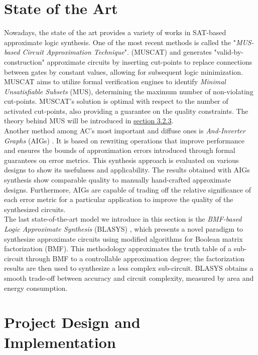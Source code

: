 \documentclass[]{usiinfbachelorproject}
\begin{document}
\section{State of the Art}\label{sec:state-of-the-art}
Nowadays, the state of the art provides a variety of works in SAT-based approximate logic synthesis. One of the most recent methods is called the "\textit{MUS-based Circuit Approximation Technique}".
(MUSCAT) \cite{muscat} and generates "valid-by-construction" approximate circuits by inserting cut-points to replace connections between gates by constant values, allowing for subsequent logic minimization. MUSCAT aims to utilize formal verification engines to identify \textit{Minimal Unsatisfiable Subsets} (MUS), determining the maximum number of non-violating cut-points. MUSCAT's solution is optimal with respect to the number of activated cut-points, also providing a guarantee on the quality constraints. The theory behind MUS will be introduced in \hyperref[subsubsec:mus]{section 3.2.3}. \\
Another method among AC's most important and diffuse ones is \textit{And-Inverter Graphs} (AIGs) \cite{aigs}. It is based on rewriting operations that improve performance and ensures the bounds of approximation errors introduced through formal guarantees on error metrics. This synthesis approach is evaluated on various designs to show its usefulness and applicability. The results obtained with AIGs synthesis show comparable quality to manually hand-crafted approximate designs. Furthermore, AIGs are capable of trading off the relative significance of each error metric for a particular application to improve the quality of the synthesized circuits. \\
The last state-of-the-art model we introduce in this section is the \textit{BMF-based Logic Approximate Synthesis} (BLASYS) \cite{blasys}, which presents a novel paradigm to synthesize approximate circuits using modified algorithms for Boolean matrix factorization (BMF). This methodology approximates the truth table of a sub-circuit through BMF to a controllable approximation degree; the factorization results are then used to synthesize a less complex sub-circuit. BLASYS obtains a smooth trade-off between accuracy and circuit complexity, measured by area and energy consumption.

\newpage

\section{Project Design and Implementation}\label{sec:project-design-and-implementation}
\end{document}
